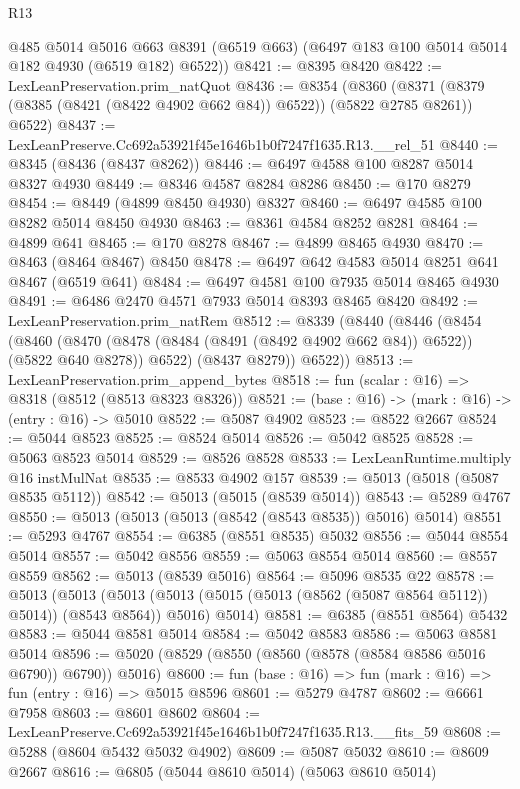 \begin{lexlean}{R13}
\begin{coremodule}
      @485
      @5014
      @5016
      @663
      @8391
      (@6519 @663)
      (@6497 @183 @100 @5014 @5014 @182 @4930 (@6519 @182) @6522))
@8421 := @8395 @8420
@8422 := LexLeanPreservation.prim_natQuot
@8436 := @8354
    (@8360 (@8371 (@8379 (@8385 (@8421 (@8422 @4902 @662 @84)) @6522)) (@5822 @2785 @8261)) @6522)
@8437 := LexLeanPreserve.Cc692a53921f45e1646b1b0f7247f1635.R13.__rel_51
@8440 := @8345 (@8436 (@8437 @8262))
@8446 := @6497 @4588 @100 @8287 @5014 @8327 @4930
@8449 := @8346 @4587 @8284 @8286
@8450 := @170 @8279
@8454 := @8449 (@4899 @8450 @4930) @8327
@8460 := @6497 @4585 @100 @8282 @5014 @8450 @4930
@8463 := @8361 @4584 @8252 @8281
@8464 := @4899 @641
@8465 := @170 @8278
@8467 := @4899 @8465 @4930
@8470 := @8463 (@8464 @8467) @8450
@8478 := @6497 @642 @4583 @5014 @8251 @641 @8467 (@6519 @641)
@8484 := @6497 @4581 @100 @7935 @5014 @8465 @4930
@8491 := @6486 @2470 @4571 @7933 @5014 @8393 @8465 @8420
@8492 := LexLeanPreservation.prim_natRem
@8512 := @8339
    (@8440
      (@8446
        (@8454
          (@8460
            (@8470 (@8478 (@8484 (@8491 (@8492 @4902 @662 @84)) @6522)) (@5822 @640 @8278))
            @6522)
          (@8437 @8279))
        @6522))
@8513 := LexLeanPreservation.prim_append_bytes
@8518 := fun (scalar : @16) => @8318 (@8512 (@8513 @8323 @8326))
@8521 := (base : @16) -> (mark : @16) -> (entry : @16) -> @5010
@8522 := @5087 @4902
@8523 := @8522 @2667
@8524 := @5044 @8523
@8525 := @8524 @5014
@8526 := @5042 @8525
@8528 := @5063 @8523 @5014
@8529 := @8526 @8528
@8533 := LexLeanRuntime.multiply @16 instMulNat
@8535 := @8533 @4902 @157
@8539 := @5013 (@5018 (@5087 @8535 @5112))
@8542 := @5013 (@5015 (@8539 @5014))
@8543 := @5289 @4767
@8550 := @5013 (@5013 (@5013 (@8542 (@8543 @8535)) @5016) @5014)
@8551 := @5293 @4767
@8554 := @6385 (@8551 @8535) @5032
@8556 := @5044 @8554 @5014
@8557 := @5042 @8556
@8559 := @5063 @8554 @5014
@8560 := @8557 @8559
@8562 := @5013 (@8539 @5016)
@8564 := @5096 @8535 @22
@8578 := @5013
    (@5013
      (@5013 (@5013 (@5015 (@5013 (@8562 (@5087 @8564 @5112)) @5014)) (@8543 @8564)) @5016)
      @5014)
@8581 := @6385 (@8551 @8564) @5432
@8583 := @5044 @8581 @5014
@8584 := @5042 @8583
@8586 := @5063 @8581 @5014
@8596 := @5020 (@8529 (@8550 (@8560 (@8578 (@8584 @8586 @5016 @6790)) @6790)) @5016)
@8600 := fun (base : @16) => fun (mark : @16) => fun (entry : @16) => @5015 @8596
@8601 := @5279 @4787
@8602 := @6661 @7958
@8603 := @8601 @8602
@8604 := LexLeanPreserve.Cc692a53921f45e1646b1b0f7247f1635.R13.__fits_59
@8608 := @5288 (@8604 @5432 @5032 @4902)
@8609 := @5087 @5032
@8610 := @8609 @2667
@8616 := @6805 (@5044 @8610 @5014) (@5063 @8610 @5014)

\end{coremodule}
\end{lexlean}
